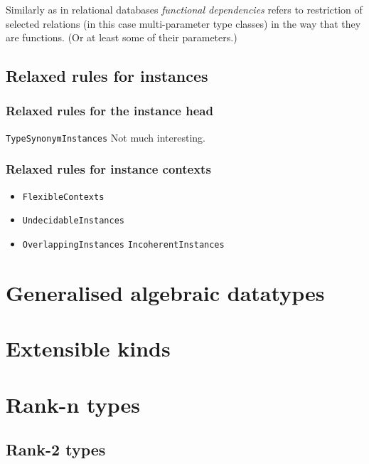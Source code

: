 \documentclass[11pt,oneside,draft]{fithesis2}
\theoremstyle{definition}
\begin{document}
Similarly as in relational databases \emph{functional dependencies} refers to
restriction of selected relations (in this case multi-parameter type classes) in the
way that they are functions. (Or at least some of their parameters.)

\subsection{Relaxed rules for instances}

\subsubsection{Relaxed rules for the instance head}

\texttt{TypeSynonymInstances} Not much interesting.

\subsubsection{Relaxed rules for instance contexts}

\begin{itemize}
\item \texttt{FlexibleContexts}
\item \texttt{UndecidableInstances}
\item \texttt{OverlappingInstances} \texttt{IncoherentInstances}
\end{itemize}

\section{Generalised algebraic datatypes}

\section{Extensible kinds}

\section{Rank-n types}
\label{extension:rankn}

\subsection{Rank-2 types}

\end{document}
